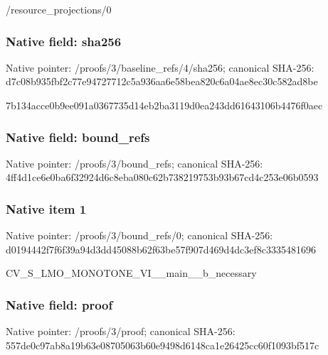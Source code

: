 \documentclass[10pt,a4paper]{article}
\begin{document}
\begingroup\raggedright\sloppy /\allowbreak{}resource\_\allowbreak{}projections/\allowbreak{}0\par\endgroup

\subsubsection{Native field: sha256}
Native pointer: /proofs/3/baseline\_\allowbreak{}refs/4/sha256; canonical SHA-256: d7c08b935fbf2c77e94727712c5a936aa6e58bea820c6a04ae8ec30c582ad8be

\begingroup\raggedright\sloppy 7b134acce0b9ee091a0367735d14eb2ba3119d0ea243dd61643106b4476f0aec\par\endgroup

\subsubsection{Native field: bound\_\allowbreak{}refs}
Native pointer: /proofs/3/bound\_\allowbreak{}refs; canonical SHA-256: 4ff4d1ce6e0ba6f32924d6c8eba080c62b738219753b93b67cd4c253e06b0593

\subsubsection{Native item 1}
Native pointer: /proofs/3/bound\_\allowbreak{}refs/0; canonical SHA-256: d0194442f7f6f39a94d3dd45088b62f63be57f907d469d4dc3ef8c3335481696

\begingroup\raggedright\sloppy CV\_\allowbreak{}S\_\allowbreak{}LMO\_\allowbreak{}MONOTONE\_\allowbreak{}VI\_\allowbreak{}\_\allowbreak{}main\_\allowbreak{}\_\allowbreak{}b\_\allowbreak{}necessary\par\endgroup

\subsubsection{Native field: proof}
Native pointer: /proofs/3/proof; canonical SHA-256: 557de0c97ab8a19b63e08705063b60e9498d6148ca1e26425cc60f1093bf517c
\end{document}
